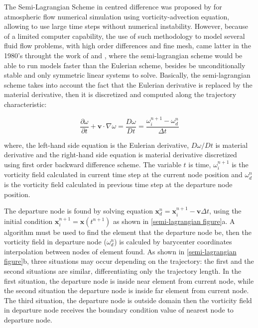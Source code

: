 The Semi-Lagrangian Scheme in centred difference was proposed by \cite{sawyer1963} for atmospheric flow numerical simulation using vorticity-advection equation, allowing to use large time steps without numerical instability. 
However, because of a limited computer capability, the use of such methodology to model several fluid flow problems, with high order differences and fine mesh, came latter in the 1980's throught the work of \cite{robert1981} and \cite{pironneau1982}, where the semi-lagrangian scheme would be able to run models faster than the Eulerian scheme, besides be unconditionally stable and only symmetric linear systems to solve. 
Basically, the semi-lagrangian scheme takes into account the fact that the Eulerian derivative is replaced by the material derivative, then it is discretized and computed along the trajectory characteristic:

\vspace{-0.4cm}
\begin{equation}
 \frac{\partial \omega}{\partial t} + \mathbf{v} \cdot \nabla \omega = 
 \frac{D \omega}{D t} = 
 \frac{\omega_{i}^{n+1} - \omega_{d}^{n}}{\Delta t}
\end{equation}

\noindent
where, 
the left-hand side equation is the Eulerian derivative,
$D\omega/Dt$ is material derivative and
the right-hand side equation is material derivative discretized using first order backward difference scheme.
The variable $t$ is time, 
$\omega_{i}^{n+1}$ is the vorticity field calculated in current time step at the current node position and
$\omega_{d}^{n}$ is the vorticity field calculated in previous time step at the departure node position.

\smallskip
The departure node is found by solving equation 
$\mathbf{x}_{d}^{n} = \mathbf{x}_{i}^{n+1} - \mathbf{v} \Delta t$, 
using the initial condition $\mathbf{x}_{i}^{n+1} = \mathbf{x}(t^{n+1})$
 as shown in \ref{semi-lagrangian figure}a. 
A algorithm must be used to find the element that the departure node be, 
then the vorticity field in departure node ($\omega_{d}^{n}$) is 
calculed by barycenter coordinates interpolation between nodes of 
element found.
As shown in \ref{semi-lagrangian figure}b, three situations may 
occur depending on the trajectory: the first and the second 
situations are similar, differentiating only the trajectory length. 
In the first situation, the departure node is inside near 
element from current node, while the second situation 
the departure node is inside far element from current node. 
The third situation, the departure node is outside domain 
then the vorticity field in departure node receives the 
boundary condition value of nearest node to departure node.

